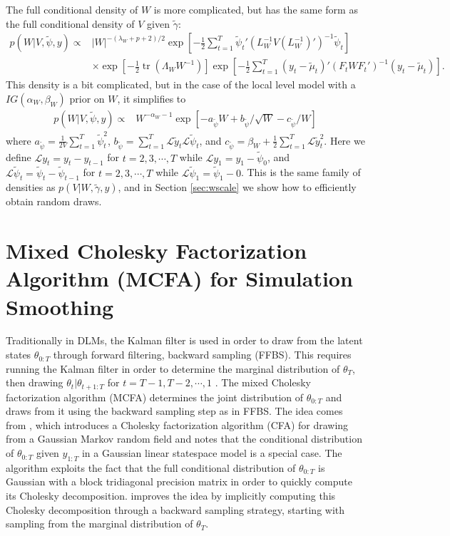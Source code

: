 \documentclass{article}
\DeclareMathOperator{\tr}{tr}
\begin{document}
The full conditional density of $W$ is more complicated, but has the same form as the full conditional density of $V$ given $\tilde{\gamma}$:
\begin{align*}
  p(W|V,\tilde{\psi},y) \propto& |W|^{-(\lambda_W + p + 2)/2}\exp\left[-\frac{1}{2}\sum_{t=1}^T\tilde{\psi}_t'(L_W^{-1}V(L_W^{-1})')^{-1}\tilde{\psi}_t\right] \\
  & \times \exp\left[-\frac{1}{2}\tr\left(\Lambda_WW^{-1}\right)\right]\exp\left[-\frac{1}{2}\sum_{t=1}^T(y_t - \tilde{\mu}_t)'(F_tWF_t')^{-1}(y_t-\tilde{\mu}_t)\right].
\end{align*}
This density is a bit complicated, but in the case of the local level model with a $IG(\alpha_W,\beta_W)$ prior on $W$, it simplifies to
\begin{align*}
p(W|V,\tilde{\psi},y) \propto& W^{-\alpha_W-1}\exp\left[ -a_{\tilde{\psi}}W + b_{\tilde{\psi}}/\sqrt{W} -c_{\tilde{\psi}}/W\right]
\end{align*}
where $a_{\tilde{\psi}} = \frac{1}{2V}\sum_{t=1}^T\tilde{\psi}_t^2$,  $b_{\tilde{\psi}} = \sum_{t=1}^T\mathcal{L}\tilde{y}_t\mathcal{L}\tilde{\psi}_t$, and $c_{\tilde{\psi}} = \beta_W + \frac{1}{2}\sum_{t=1}^T\mathcal{L}\tilde{y}_t^2$. Here we define $\mathcal{L}y_t = y_t - y_{t-1}$ for $t=2,3,\cdots,T$ while $\mathcal{L}y_1 = y_1 - \tilde{\psi}_0$, and $\mathcal{L}\tilde{\psi}_t = \tilde{\psi}_t - \tilde{\psi}_{t-1}$ for $t=2,3,\cdots,T$ while $\mathcal{L}\tilde{\psi}_1 = \tilde{\psi}_1 - 0$. This is the same family of densities as $p(V|W,\tilde{\gamma},y)$, and in Section \ref{sec:wscale} we show how to efficiently obtain random draws.

\section{Mixed Cholesky Factorization Algorithm (MCFA) for Simulation Smoothing}\label{sec:MCFA}

Traditionally in DLMs, the Kalman filter is used in order to draw from the latent states $\theta_{0:T}$ through forward filtering, backward sampling (FFBS). This requires running the Kalman filter in order to determine the marginal distribution of $\theta_T$, then drawing $\theta_t|\theta_{t+1:T}$ for $t=T-1,T-2,\cdots,1$ \cite{carter1994gibbs,fruhwirth1994data}. The mixed Cholesky factorization algorithm (MCFA) determines the joint distribution of $\theta_{0:T}$ and draws from it using the backward sampling step as in FFBS. The idea comes from , which introduces a Cholesky factorization algorithm (CFA) for drawing from a Gaussian Markov random field and notes that the conditional distribution of $\theta_{0:T}$ given $y_{1:T}$ in a Gaussian linear statespace model is a special case. The algorithm exploits the fact that the full conditional distribution of $\theta_{0:T}$ is Gaussian with a block tridiagonal precision matrix in order to quickly compute its Cholesky decomposition.  improves the idea by implicitly computing this Cholesky decomposition through a backward sampling strategy, starting with sampling from the marginal distribution of $\theta_T$. 
\end{document}
